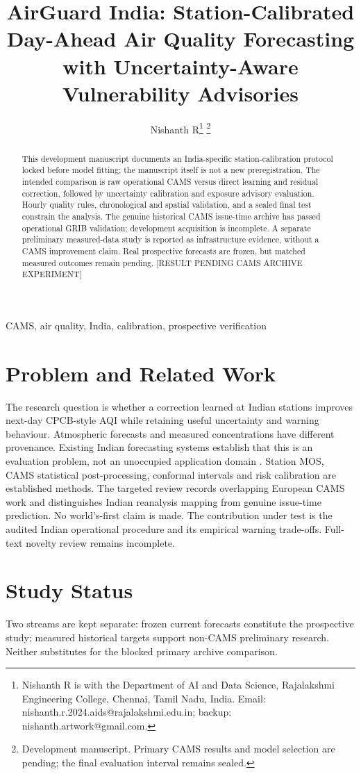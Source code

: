 \documentclass[journal]{IEEEtran}
\title{AirGuard India: Station-Calibrated Day-Ahead Air Quality Forecasting with Uncertainty-Aware Vulnerability Advisories}
\author{Nishanth R\thanks{Nishanth R is with the Department of AI and Data Science,
Rajalakshmi Engineering College, Chennai, Tamil Nadu, India.
Email: nishanth.r.2024.aids@rajalakshmi.edu.in; backup: nishanth.artwork@gmail.com.}
\thanks{Development manuscript. Primary CAMS results and model selection are pending;
the final evaluation interval remains sealed.}}
\begin{document}
\maketitle
\begin{abstract}
This development manuscript documents an India-specific station-calibration
protocol locked before model fitting; the manuscript itself is not a new
preregistration. The intended comparison is raw operational CAMS versus direct learning
and residual correction, followed by uncertainty calibration and exposure
advisory evaluation. Hourly quality rules, chronological and spatial validation,
and a sealed final test constrain the analysis. The genuine historical CAMS issue-time archive has passed operational GRIB validation; development acquisition is incomplete. A separate preliminary measured-data
study is reported as infrastructure evidence, without a CAMS improvement claim.
Real prospective forecasts are frozen, but matched measured outcomes remain
pending. [RESULT PENDING CAMS ARCHIVE EXPERIMENT]
\end{abstract}
\begin{IEEEkeywords}CAMS, air quality, India, calibration, prospective verification\end{IEEEkeywords}
\section{Problem and Related Work}
The research question is whether a correction learned at Indian stations
improves next-day CPCB-style AQI while retaining useful uncertainty and warning
behaviour. Atmospheric forecasts and measured concentrations have different
provenance. Existing Indian forecasting systems establish that this is an
evaluation problem, not an unoccupied application domain \cite{jena2021delhi}.
Station MOS, CAMS statistical post-processing, conformal intervals and risk
calibration are established methods. The targeted review records overlapping
European CAMS work and distinguishes Indian reanalysis mapping from genuine
issue-time prediction. No world's-first claim is made. The contribution under
test is the audited Indian operational procedure and its empirical warning
trade-offs. Full-text novelty review remains incomplete.
\section{Study Status}
Two streams are kept separate: frozen current forecasts constitute the
prospective study; measured historical targets support non-CAMS preliminary
research. Neither substitutes for the blocked primary archive comparison.
\end{document}
